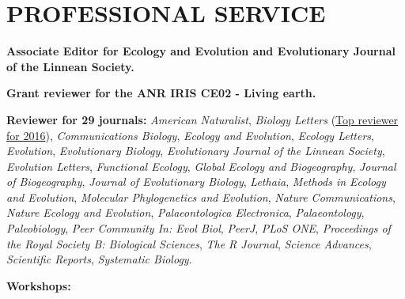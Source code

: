 \documentclass[10pt,a4paper]{article}
\begin{document}
{\bigskip

\bigskip


\section{PROFESSIONAL SERVICE}

\raggedright\textbf{Associate Editor for Ecology and Evolution and Evolutionary Journal of the Linnean Society.}

\raggedright\textbf{Grant reviewer for the ANR IRIS CE02 - Living earth.}

\raggedright\textbf{Reviewer for 29 journals:} %
\textit{American Naturalist},
\textit{Biology Letters} (\href{http://blogs.royalsociety.org/publishing/biology-letters-top-reviewers-from-2016/}{Top reviewer for 2016}),
\textit{Communications Biology},
\textit{Ecology and Evolution},
\textit{Ecology Letters},
\textit{Evolution},
\textit{Evolutionary Biology},
\textit{Evolutionary Journal of the Linnean Society},
\textit{Evolution Letters},
\textit{Functional Ecology},
\textit{Global Ecology and Biogeography},
\textit{Journal of Biogeography},
\textit{Journal of Evolutionary Biology},
\textit{Lethaia},
\textit{Methods in Ecology and Evolution},
\textit{Molecular Phylogenetics and Evolution},
\textit{Nature Communications},
\textit{Nature Ecology and Evolution},
\textit{Palaeontologica Electronica},
\textit{Palaeontology},
\textit{Paleobiology},
\textit{Peer Community In: Evol Biol},
\textit{PeerJ},
\textit{PLoS ONE},
\textit{Proceedings of the Royal Society B: Biological Sciences},
\textit{The R Journal},
\textit{Science Advances},
\textit{Scientific Reports},
\textit{Systematic Biology}.

\bigskip
\raggedright\textbf{Workshops:}

}
\end{document}

